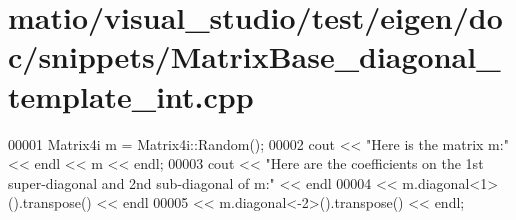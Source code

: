 \hypertarget{matio_2visual__studio_2test_2eigen_2doc_2snippets_2_matrix_base__diagonal__template__int_8cpp_source}{}\section{matio/visual\+\_\+studio/test/eigen/doc/snippets/\+Matrix\+Base\+\_\+diagonal\+\_\+template\+\_\+int.cpp}
\label{matio_2visual__studio_2test_2eigen_2doc_2snippets_2_matrix_base__diagonal__template__int_8cpp_source}

\begin{DoxyCode}
00001 Matrix4i m = Matrix4i::Random();
00002 cout << \textcolor{stringliteral}{"Here is the matrix m:"} << endl << m << endl;
00003 cout << \textcolor{stringliteral}{"Here are the coefficients on the 1st super-diagonal and 2nd sub-diagonal of m:"} << endl
00004      << m.diagonal<1>().transpose() << endl
00005      << m.diagonal<-2>().transpose() << endl;
\end{DoxyCode}
